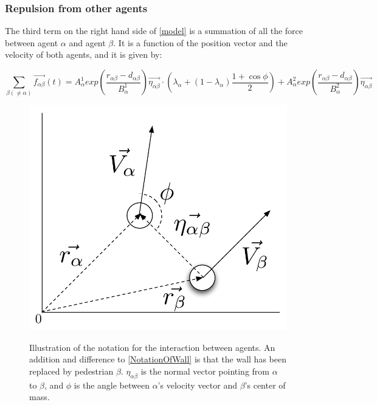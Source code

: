  
\subsubsection{Repulsion from other agents}
The third term on the right hand side of \eqref{model} is a summation of all the 
force between agent $\alpha$ and agent $\beta$. It is a function of the position vector and the velocity of 
both agents, and it is given by:

\begin{equation}
    \sum_{\beta \left( \neq \alpha \right)}
        \vec{f_{\alpha \beta }}\left( t \right) =
        A_{\alpha}^{1} exp \left(
            \frac{ r_{\alpha \beta} - d_{\alpha \beta }}
                 {B_{\alpha}^1}
        \right)
    \vec{\eta_{\alpha \beta}} \cdot
    \left(
        \lambda_{\alpha} + \left(
            1 - \lambda_{\alpha}
        \right)
		\frac{1+\cos{\phi}}{2}
    \right) +
    A_{\alpha}^{2} exp\left(
        \frac{r_{\alpha \beta} - d_{\alpha \beta}}
             {B_{\alpha}^{2}}
    \right)
    \vec{\eta_{\alpha \beta}}
    \label{agentinteraction}
\end{equation}

\begin{figure}[ht]
    \centering
    {\includegraphics[scale=0.35]{Figures/NotationOfInteraction.pdf}} 
    \caption[Notation of the interaction between two agents]{Illustration of the notation for the interaction between agents.
	     An addition and difference to \ref{NotationOfWall} is that the wall has been replaced by pedestrian $\beta$.
	     $\eta_{\alpha \beta}$ is the normal vector pointing from $\alpha$ to $\beta$, and $\phi$ is the angle between $\alpha$'s 
	     velocity vector and $\beta$'s center of mass.}
    \label{NotationOfInteraction}
\end{figure}

